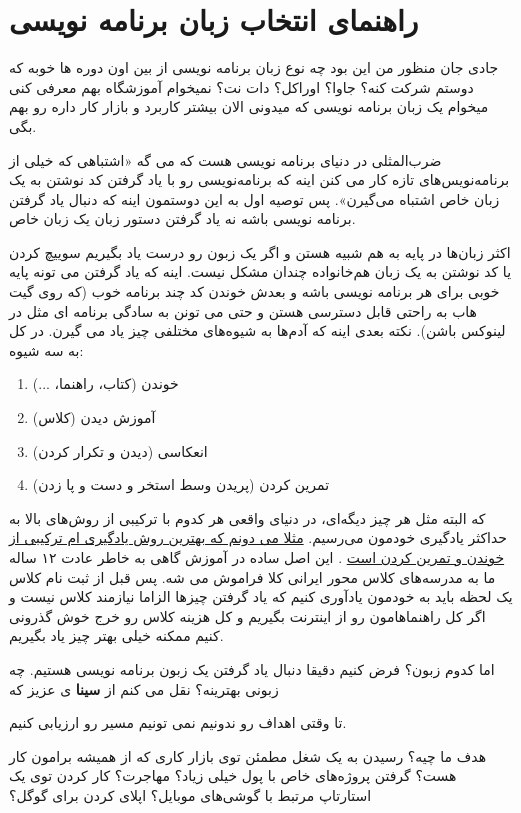 \section{راهنمای انتخاب زبان برنامه نویسی}
\begin{mybox}
جادی جان منظور من این بود چه نوع زبان برنامه نویسی از بین اون دوره ها خوبه که دوستم شرکت کنه؟ جاوا؟ اوراکل؟ دات نت؟ نمیخوام آموزشگاه بهم معرفی کنی میخوام یک زبان برنامه نویسی که میدونی الان بیشتر کاربرد و بازار کار داره رو بهم بگی.
\end{mybox}
ضرب‌المثلی در دنیای برنامه نویسی هست که می گه «اشتباهی که خیلی از برنامه‌نویس‌های تازه کار می کنن اینه که برنامه‌نویسی رو با یاد گرفتن کد نوشتن به یک زبان خاص اشتباه می‌گیرن». پس توصیه اول به این دوستمون اینه که دنبال یاد گرفتن برنامه نویسی باشه نه یاد گرفتن دستور زبان یک زبان خاص.

 اکثر زبان‌ها در پایه به هم شبیه هستن و اگر یک زبون رو درست یاد بگیریم سوییچ کردن یا کد نوشتن به یک زبان هم‌خانواده چندان مشکل نیست. اینه که یاد گرفتن  می تونه پایه خوبی برای هر برنامه نویسی باشه و بعدش خوندن کد چند برنامه خوب (که روی گیت هاب به راحتی قابل دسترسی هستن و حتی می تونن به سادگی برنامه ای مثل  در لینوکس باشن).
نکته بعدی اینه که آدم‌ها به شیوه‌های مختلفی چیز یاد می گیرن. در کل به سه شیوه:
\begin{enumerate}
\item خوندن (کتاب، راهنما، ...)
\item آموزش دیدن (کلاس)
\item انعکاسی (دیدن و تکرار کردن)
\item تمرین کردن (پریدن وسط استخر و دست و پا زدن)
\end{enumerate}
که البته مثل هر چیز دیگه‌ای، در دنیای واقعی هر کدوم با ترکیبی از روش‌های بالا به حداکثر یادگیری خودمون می‌رسیم.
\href{http://jadi.net/2011/12/\%da\%86\%d8\%b7\%d9\%88\%d8\%b1\%db\%8c-\%d8\%a7\%d8\%b3\%da\%a9\%d8\%b1\%db\%8c\%d9\%be\%d8\%aa-\%d9\%86\%d9\%88\%db\%8c\%d8\%b3\%db\%8c-\%d8\%a8\%d8\%b4-\%db\%8c\%d8\%a7-\%d9\%87\%d8\%b1-\%da\%86\%db\%8c\%d8\%b2-\%d8\%af\%db\%8c\%da\%af\%d9\%87-\%db\%8c\%d8\%a7/" title="چطوری اسکریپت نویسی بش یا هر چیز دیگه یاد بگیریم؟}{مثلا می دونم که بهترین روش یادگیری ام ترکیبی از خوندن و تمرین کردن است}
. این اصل ساده در آموزش گاهی به خاطر عادت ۱۲ ساله ما به مدرسه‌های کلاس محور ایرانی کلا فراموش می شه. پس قبل از ثبت نام کلاس یک لحظه باید به خودمون یادآوری کنیم که یاد گرفتن چیزها الزاما نیازمند کلاس نیست و اگر کل راهنماهامون رو از اینترنت بگیریم و کل هزینه کلاس رو خرج خوش گذرونی کنیم ممکنه خیلی بهتر چیز یاد بگیریم.

اما کدوم زبون؟ فرض کنیم دقیقا دنبال یاد گرفتن یک زبون برنامه نویسی هستیم. چه زبونی بهترینه؟ نقل می کنم از
\textbf{سینا}
ی عزیز که
\begin{mybox}
تا وقتی اهداف رو ندونیم نمی تونیم مسیر رو ارزیابی کنیم.
\end{mybox}
هدف ما چیه؟‌ رسیدن به یک شغل مطمئن توی بازار کاری که از همیشه برامون کار هست؟ گرفتن پروژه‌های خاص با پول خیلی زیاد؟ مهاجرت؟ کار کردن توی یک استارتاپ مرتبط با گوشی‌های موبایل؟ اپلای کردن برای گوگل؟

